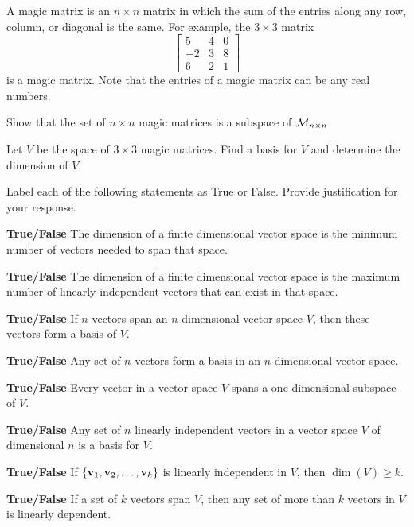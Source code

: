 \item A magic matrix is an $n \times n$ matrix in which the sum of the entries along any row, column, or diagonal is the same. For example, the $3 \times 3$ matrix 
\[\left[ \begin{array}{rcc} 5&4&0 \\ -2&3&8 \\ 6&2&1 \end{array} \right]\]
is a magic matrix. Note that the entries of a magic matrix can be any real numbers. 
\ba
\item Show that the set of $n \times n$ magic matrices is a subspace of $\mathcal{M}_{n \times n}$. 

\item Let $V$ be the space of $3 \times 3$ magic matrices. Find a basis for $V$ and determine the dimension of $V$. 

\ea

\item Label each of the following statements as True or False. Provide justification for your response.
\ba
\item \textbf{True/False} The dimension of a finite dimensional vector space is the minimum number of vectors needed to span that space.

\item \textbf{True/False} The dimension of a finite dimensional vector space is the maximum number of linearly independent vectors that can exist in that space.

\item \textbf{True/False} If $n$ vectors span an $n$-dimensional vector space $V$, then these vectors form a basis of $V$.

\item \textbf{True/False} Any set of $n$ vectors form a basis in an $n$-dimensional vector space.

\item \textbf{True/False} Every vector in a vector space $V$ spans a one-dimensional subspace of $V$.

\item \textbf{True/False} Any set of $n$ linearly independent vectors in a vector space $V$ of  dimensional $n$ is a basis for $V$. 

\item \textbf{True/False} If $\{\mathbf{v}_1, \mathbf{v}_2, \ldots, \mathbf{v}_k\}$ is linearly independent in $V$, then $\dim(V)\geq k$.

\item \textbf{True/False} If a set of $k$ vectors span $V$, then any set of more than $k$ vectors in $V$ is linearly dependent.

